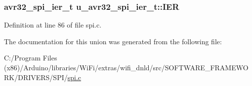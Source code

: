 \subsubsection[{I\+E\+R}]{\setlength{\rightskip}{0pt plus 5cm}avr32\+\_\+spi\+\_\+ier\+\_\+t u\+\_\+avr32\+\_\+spi\+\_\+ier\+\_\+t\+::\+I\+E\+R}\label{unionu__avr32__spi__ier__t_ab999f7265b21cf8e7d3e1997ce8088f6}


Definition at line 86 of file spi.\+c.



The documentation for this union was generated from the following file\+:\begin{DoxyCompactItemize}
\item 
C\+:/\+Program Files (x86)/\+Arduino/libraries/\+Wi\+Fi/extras/wifi\+\_\+dnld/src/\+S\+O\+F\+T\+W\+A\+R\+E\+\_\+\+F\+R\+A\+M\+E\+W\+O\+R\+K/\+D\+R\+I\+V\+E\+R\+S/\+S\+P\+I/\hyperlink{spi_8c}{spi.\+c}\end{DoxyCompactItemize}
